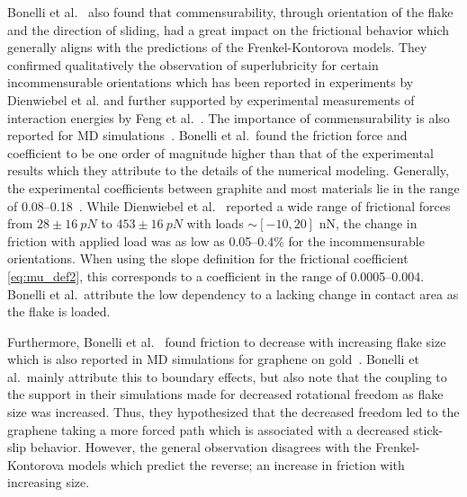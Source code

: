 Bonelli et al.~\cite{bonelli_atomistic_2009} also found that commensurability,
through orientation of the flake and the direction of sliding, had a great
impact on the frictional behavior which generally aligns with the predictions of
the Frenkel-Kontorova models. They confirmed qualitatively the
observation of superlubricity for certain incommensurable orientations which has
been reported in experiments by Dienwiebel et al.\cite{DIENWIEBEL2005197} and
further supported by experimental measurements of interaction energies by Feng
et al.~\cite{feng_superlubric_2013}. The importance of commensurability is also
reported for \acrshort{MD} simulations~\cite{ma12091425, zhu_study_2018,
Wijn_2011}. Bonelli et al.\ found the friction force and coefficient to be one
order of magnitude higher than that of the experimental results which they
attribute to the details of the numerical modeling. Generally, the experimental
coefficients between graphite and most materials lie in the range of 0.08--0.18~\cite{DIENWIEBEL2005197}. While Dienwiebel et al.~\cite{DIENWIEBEL2005197}
reported a wide range of frictional forces from $28 \pm \SI{16}{pN}$ to $453 \pm \SI{16}{pN}$ with loads $\sim [-10, 20]$ nN, the change in friction with applied load was
as low as 0.05--0.4\% for the incommensurable orientations. When using the slope definition for the frictional coefficient \cref{eq:mu_def2}, this corresponds to a coefficient in the range of 0.0005--0.004. Bonelli et al.\ attribute the low dependency to a lacking change in contact area as the flake is loaded. 

Furthermore, Bonelli et al.~\cite{bonelli_atomistic_2009} found friction to
decrease with increasing flake size which is also reported in \acrshort{MD}
simulations for graphene on gold~\cite{zhu_study_2018}. Bonelli et al.\ mainly
attribute this to boundary effects, but also note that the coupling to the
support in their simulations made for decreased rotational freedom as flake size was increased. Thus,
they hypothesized that the decreased freedom led to the graphene taking a more
forced path which is associated with a decreased stick-slip behavior. However, the
general observation disagrees with the Frenkel-Kontorova
models which predict the reverse; an increase in friction with increasing size. 

